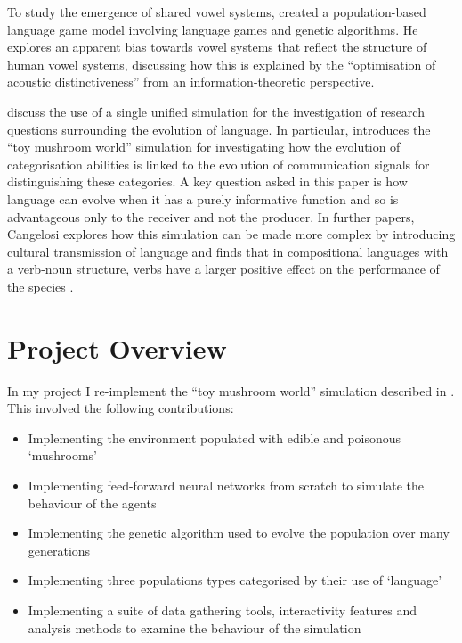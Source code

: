 \documentclass[12pt,a4paper,twoside,openright]{report}
\begin{document}
To study the emergence of shared vowel systems, \citet{de1997generating} created a population-based language game model involving language games and genetic algorithms. He explores an apparent bias towards vowel systems that reflect the structure of human vowel systems, discussing how this is explained by the ``optimisation of acoustic distinctiveness'' from an information-theoretic perspective.

\citet{parisi2002unified}  discuss the use of a single unified simulation for the investigation of research questions surrounding the evolution of language. In particular, \citet{Cangelosi1998} introduces the ``toy mushroom world'' simulation for investigating how the evolution of categorisation abilities is linked to the evolution of communication signals for distinguishing these categories. A key question asked in this paper is how language can evolve when it has a purely informative function and so is  advantageous only to the receiver and not the producer. In further papers, Cangelosi explores how this simulation can be made more complex by introducing cultural transmission of language and finds that in compositional languages with a verb-noun structure, verbs have a larger positive effect on the performance of the species \citep{cangelosi2001evolution}.

\section{Project Overview}

In my project I re-implement the ``toy mushroom world'' simulation described in \citet{Cangelosi1998}. This involved the following contributions:

\begin{itemize}
	\item Implementing the environment populated with edible and poisonous `mushrooms'
	\item Implementing feed-forward neural networks from scratch to simulate the behaviour of the agents
	\item Implementing the genetic algorithm used to evolve the population over many generations
	\item Implementing three populations types categorised by their use of `language'
	\item Implementing a suite of data gathering tools, interactivity features and analysis methods to examine the behaviour of the simulation
\end{itemize}
\end{document}
